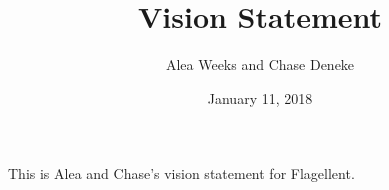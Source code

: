 \documentclass[12pt]{article}
\title{Vision Statement}
\author{Alea Weeks and Chase Deneke}
\date{January 11, 2018}
\begin{document}
\maketitle

This is Alea and Chase's vision statement for Flagellent.
\end{document}
